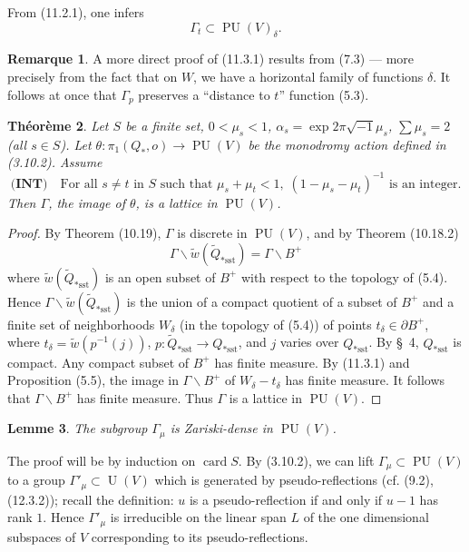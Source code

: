 \documentclass[12pt,a4paper]{article}
\theoremstyle{plain}
\newtheorem{theorem}{Th\'eor\`eme}[section]
\newtheorem{lemma}[theorem]{Lemme}
\theoremstyle{definition}
\newtheorem{remark}[theorem]{Remarque}
\theoremstyle{remark}
\DeclareMathOperator{\card}{card}
\DeclareMathOperator{\PU}{PU}
\DeclareMathOperator{\U}{U}
\begin{document}
From (11.2.1), one infers
\begin{equation}
\label{11.3.1}
\Gamma_t \subset \PU(V)_\delta.
\end{equation}

\begin{remark}
A more direct proof of (11.3.1) results from (7.3) --- more precisely from the fact that on $W$, we have a horizontal family of functions $\delta$. It follows at once that $\Gamma_p$ preserves a ``distance to $t$'' function (5.3).
\end{remark}

\begin{theorem}
\label{11.4}
Let $S$ be a finite set, $0 < \mu_s < 1$, $\alpha_s = \exp 2\pi\sqrt{-1}\mu_s$, $\sum \mu_s = 2$ (all $s \in S$). Let $\theta : \pi_1(Q_*, o) \to \PU(V)$ be the monodromy action defined in (3.10.2). Assume
\[
\textbf{(INT)} \quad \text{For all } s \neq t \text{ in } S \text{ such that } \mu_s + \mu_t < 1, \; (1 - \mu_s - \mu_t)^{-1} \text{ is an integer}.
\]
Then $\Gamma$, the image of $\theta$, is a lattice in $\PU(V)$.
\end{theorem}

\begin{proof}
By Theorem (10.19), $\Gamma$ is discrete in $\PU(V)$, and by Theorem (10.18.2)
\[
\Gamma \backslash \widetilde{w}(\widetilde{Q}_{*\text{sst}}) = \Gamma \backslash B^+
\]
where $\widetilde{w}(\widetilde{Q}_{*\text{sst}})$ is an open subset of $B^+$ with respect to the topology of (5.4). Hence $\Gamma \backslash \widetilde{w}(\widetilde{Q}_{*\text{sst}})$ is the union of a compact quotient of a subset of $B^+$ and a finite set of neighborhoods $W_\delta$ (in the topology of (5.4)) of points $t_\delta \in \partial B^+$, where $t_\delta = \widetilde{w}(p^{-1}(j))$, $p : \widetilde{Q}_{*\text{sst}} \to Q_{*\text{sst}}$, and $j$ varies over $Q_{*\text{sst}}$. By \S\ 4, $Q_{*\text{sst}}$ is compact. Any compact subset of $B^+$ has finite measure. By (11.3.1) and Proposition (5.5), the image in $\Gamma \backslash B^+$ of $W_\delta - t_\delta$ has finite measure. It follows that $\Gamma \backslash B^+$ has finite measure. Thus $\Gamma$ is a lattice in $\PU(V)$.
\end{proof}

\begin{lemma}
\label{11.5}
The subgroup $\Gamma_\mu$ is Zariski-dense in $\PU(V)$.
\end{lemma}

The proof will be by induction on $\card S$. By (3.10.2), we can lift $\Gamma_\mu \subset \PU(V)$ to a group $\Gamma'_\mu \subset \U(V)$ which is generated by pseudo-reflections (cf. (9.2), (12.3.2)); recall the definition: $u$ is a pseudo-reflection if and only if $u - 1$ has rank $1$. Hence $\Gamma'_\mu$ is irreducible on the linear span $L$ of the one dimensional subspaces of $V$ corresponding to its pseudo-reflections.
\end{document}
